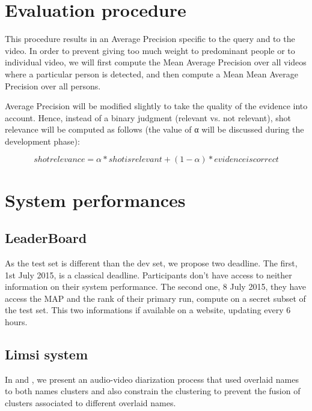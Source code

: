 \documentclass{acm_proc_article-me}
\begin{document}
\section{Evaluation procedure}

This procedure results in an Average Precision specific to the query and to the video. In order to prevent giving too much weight to predominant people or to individual video, we will first compute the Mean Average Precision over all videos where a particular person is detected, and then compute a Mean Mean Average Precision over all persons.

Average Precision will be modified slightly to take the quality of the evidence into account. Hence, instead of a binary judgment (relevant vs. not relevant), shot relevance will be computed as follows (the value of α will be discussed during the development phase):

$$ shot relevance = \alpha * shot is relevant + (1 - \alpha) * evidence is correct $$


\section{System performances}

\subsection{LeaderBoard}

As the test set is different than the dev set, we propose two deadline. The first, 1st July 2015, is a classical deadline. Participants don't have access to neither information on their system performance. The second one, 8 July 2015, they have access the MAP and the rank of their primary run, compute on a secret subset of the test set. This two informations if available on a website, updating every 6 hours.

\subsection{Limsi system}

In \cite{POIGNANT--ASLP--2015} and \cite{POIGNANT--MTAP--2015}, we present an audio-video diarization process that used overlaid names to both names clusters and also constrain the clustering to prevent the fusion of clusters associated to different overlaid names.
\end{document}
